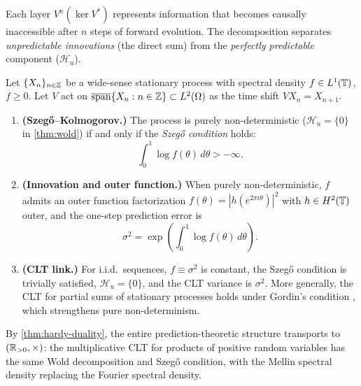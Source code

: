 Each layer $V^n(\ker V^*)$ represents information that becomes causally inaccessible after $n$ steps of forward evolution. The decomposition separates \emph{unpredictable innovations} (the direct sum) from the \emph{perfectly predictable} component ($\mathcal{H}_u$).

\begin{proposition}\label{prop:clt-prediction}
Let $\{X_n\}_{n \in \mathbb{Z}}$ be a wide-sense stationary process with spectral density $f \in L^1(\mathbb{T})$, $f \geq 0$. Let $V$ act on $\overline{\operatorname{span}}\{X_n : n \in \mathbb{Z}\} \subset L^2(\Omega)$ as the time shift $VX_n = X_{n+1}$.
\begin{enumerate}[label=(\roman*)]
\item \textbf{(Szeg\H{o}--Kolmogorov.)} The process is purely non-deterministic ($\mathcal{H}_u = \{0\}$ in \cref{thm:wold}) if and only if the \emph{Szeg\H{o} condition} holds:
\[
\int_0^1 \log f(\theta)\, d\theta > -\infty.
\]

\item \textbf{(Innovation and outer function.)} When purely non-deterministic,
$f$ admits an outer function factorization
$f(\theta) = |h(e^{2\pi i\theta})|^2$ with $h \in H^2(\mathbb{T})$ outer,
and the one-step prediction error is
\[
\sigma^2 = \exp\left(\int_0^1 \log f(\theta)\, d\theta\right).
\]

\item \textbf{(CLT link.)} For i.i.d.\ sequences, $f \equiv \sigma^2$ is constant, the Szeg\H{o} condition is trivially satisfied, $\mathcal{H}_u = \{0\}$, and the CLT variance is $\sigma^2$. More generally, the CLT for partial sums of stationary processes holds under Gordin's condition \cite[Theorem~35.5]{Billingsley}, which strengthens pure non-determinism.
\end{enumerate}
By \cref{thm:hardy-duality}, the entire prediction-theoretic structure transports to $(\mathbb{R}_{>0}, \times)$: the multiplicative CLT for products of positive random variables has the same Wold decomposition and Szeg\H{o} condition, with the Mellin spectral density replacing the Fourier spectral density.
\end{proposition}

